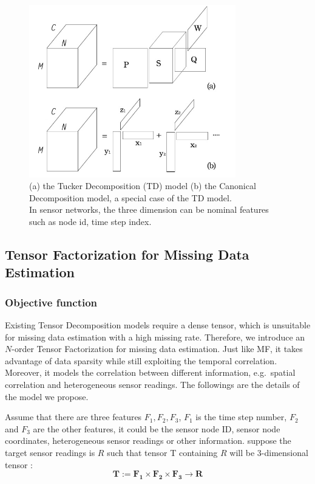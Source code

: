 \begin{figure}[h] 
\includegraphics[width=9cm]{tf.jpg} 
\caption{ (a) the Tucker Decomposition (TD) model (b) the Canonical Decomposition model, a special case of the TD model.\\In sensor networks, the three dimension can be nominal features such as node id, time step index.} 
\label{fig:tf:tuckcanon} 
\end{figure}

\subsection{Tensor Factorization for Missing Data Estimation} \label{sec:tfmissing}
\subsubsection{Objective function}

Existing Tensor Decomposition models require a dense tensor, which is unsuitable for missing data estimation with a high missing rate.
Therefore, we introduce an $N$-order Tensor Factorization for missing data estimation.
Just like MF, it takes advantage of data sparsity while still exploiting the temporal correlation.
Moreover, it models the correlation between different information, e.g.\ spatial correlation and heterogeneous sensor readings.
The followings are the details of the model we propose.

Assume that there are three features $F_1, F_2 , F_3$, $F_1$ is the time step number, $F_2$ and $F_3$ are the other features, it could be the sensor node ID, sensor node coordinates, heterogeneous sensor readings or other information.
suppose the target sensor readings is $R$ such that tensor T containing  $R$ will be 3-dimensional tensor :
\begin{equation*}
\mathbf{T} := \mathbf{F_1} \times  \mathbf{F_2} \times \mathbf{F_3} \rightarrow \mathbf{R}
\end{equation*}


